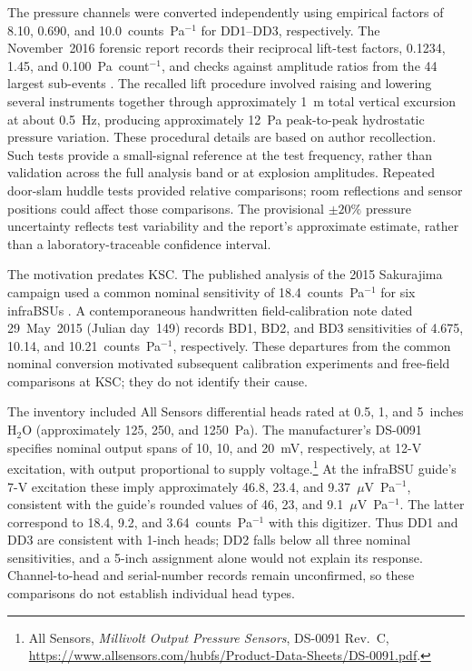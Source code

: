 \documentclass[]{seismica}
\begin{document}
The pressure channels were converted independently using empirical factors of
8.10, 0.690, and 10.0~counts~Pa$^{-1}$ for DD1--DD3, respectively.
The November~2016 forensic report records their reciprocal lift-test factors,
0.1234, 1.45, and 0.100~Pa~count$^{-1}$, and checks against amplitude ratios
from the 44 largest sub-events \citep{thompson_mcnutt_fireball_2016}.
The recalled lift procedure involved raising and lowering several instruments
together through approximately 1~m total vertical excursion at about 0.5~Hz,
producing approximately 12~Pa peak-to-peak hydrostatic pressure variation.
These procedural details are based on author recollection. Such tests provide
a small-signal reference at the test frequency, rather than validation across
the full analysis band or at explosion amplitudes. Repeated door-slam huddle
tests provided relative comparisons; room reflections and sensor positions
could affect those comparisons. The provisional $\pm20\%$ pressure uncertainty
reflects test variability and the report's approximate estimate, rather than
a laboratory-traceable confidence interval.

The motivation predates KSC. The published analysis of the 2015 Sakurajima
campaign used a common nominal sensitivity of 18.4~counts~Pa$^{-1}$ for six infraBSUs
\citep{smith_sakurajima_2020}. A contemporaneous handwritten field-calibration
note dated 29~May~2015 (Julian day~149) records BD1, BD2, and BD3 sensitivities
of 4.675, 10.14, and 10.21~counts~Pa$^{-1}$, respectively. These departures
from the common nominal conversion motivated subsequent calibration
experiments and free-field comparisons at KSC; they do not identify their cause.

The inventory included All Sensors differential heads rated at 0.5, 1, and
5~inches H$_2$O (approximately 125, 250, and 1250~Pa). The manufacturer's
DS-0091 specifies nominal output spans of 10, 10, and 20~mV, respectively,
at 12-V excitation, with output proportional to supply voltage.\footnote{All
Sensors, \textit{Millivolt Output Pressure Sensors}, DS-0091 Rev.~C,
\url{https://www.allsensors.com/hubfs/Product-Data-Sheets/DS-0091.pdf}.}
At the infraBSU guide's 7-V excitation these imply approximately 46.8, 23.4,
and 9.37~$\mu$V~Pa$^{-1}$, consistent with the guide's rounded values of
46, 23, and 9.1~$\mu$V~Pa$^{-1}$. The latter correspond to 18.4, 9.2, and
3.64~counts~Pa$^{-1}$ with this digitizer. Thus DD1 and DD3 are consistent
with 1-inch heads; DD2 falls below all three nominal sensitivities, and a
5-inch assignment alone would not explain its response. Channel-to-head and
serial-number records remain unconfirmed, so these comparisons do not establish
individual head types.
\end{document}

